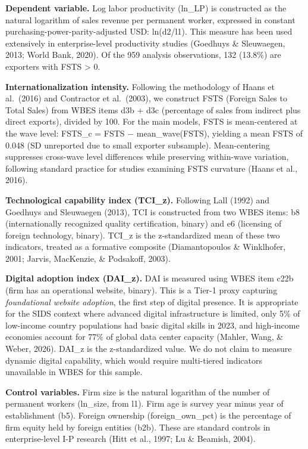 \documentclass[
  12pt,a4paper]{article}
\begin{document}
\textbf{Dependent variable.} Log labor productivity (ln\_LP) is
constructed as the natural logarithm of sales revenue per permanent
worker, expressed in constant purchasing-power-parity-adjusted USD:
ln(d2/l1). This measure has been used extensively in enterprise-level
productivity studies (Goedhuys \& Sleuwaegen, 2013; World Bank, 2020).
Of the 959 analysis observations, 132 (13.8\%) are exporters with FSTS
\textgreater{} 0.

\textbf{Internationalization intensity.} Following the methodology of
Haans et al.~(2016) and Contractor et al.~(2003), we construct FSTS
(Foreign Sales to Total Sales) from WBES items d3b + d3c (percentage of
sales from indirect plus direct exports), divided by 100. For the main
models, FSTS is mean-centered at the wave level: FSTS\_c = FSTS −
mean\_wave(FSTS), yielding a mean FSTS of 0.048 (SD unreported due to
small exporter subsample). Mean-centering suppresses cross-wave level
differences while preserving within-wave variation, following standard
practice for studies examining FSTS curvature (Haans et al., 2016).

\textbf{Technological capability index (TCI\_z).} Following Lall (1992)
and Goedhuys and Sleuwaegen (2013), TCI is constructed from two WBES
items: b8 (internationally recognized quality certification, binary) and
e6 (licensing of foreign technology, binary). TCI\_z is the
z-standardized mean of these two indicators, treated as a formative
composite (Diamantopoulos \& Winklhofer, 2001; Jarvis, MacKenzie, \&
Podsakoff, 2003).

\textbf{Digital adoption index (DAI\_z).} DAI is measured using WBES
item c22b (firm has an operational website, binary). This is a Tier-1
proxy capturing \emph{foundational website adoption}, the first step of
digital presence. It is appropriate for the SIDS context where advanced
digital infrastructure is limited, only 5\% of low-income country
populations had basic digital skills in 2023, and high-income economies
account for 77\% of global data center capacity (Mahler, Wang, \& Weber,
2026). DAI\_z is the z-standardized value. We do not claim to measure
dynamic digital capability, which would require multi-tiered indicators
unavailable in WBES for this sample.

\textbf{Control variables.} Firm size is the natural logarithm of the
number of permanent workers (ln\_size, from l1). Firm age is survey year
minus year of establishment (b5). Foreign ownership (foreign\_own\_pct)
is the percentage of firm equity held by foreign entities (b2b). These
are standard controls in enterprise-level I-P research (Hitt et al.,
1997; Lu \& Beamish, 2004).
\end{document}
